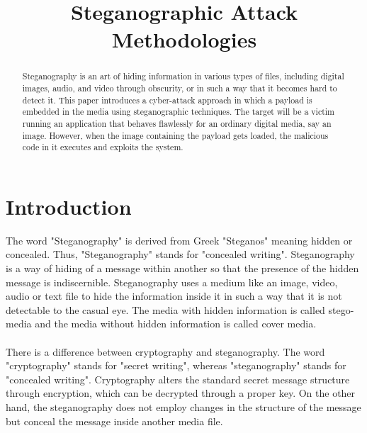 \documentclass[12ptpt,conference]{IEEEtran}
\begin{document}
\title{ \bfseries { Steganographic Attack Methodologies}}

\author{
\and
{}
\and
{}
}


\maketitle

\begin{abstract}
\noindent Steganography is an art of hiding information in various types of files, including digital images, audio, and video through obscurity, 
or in such a way that it becomes hard to detect it. This paper introduces a cyber-attack approach in which a payload is embedded in the media using steganographic techniques. The target will be a victim running an application that behaves flawlessly for an ordinary digital media, say an image. However, when the image containing the payload gets loaded, the malicious code in it executes and exploits the system.

\end{abstract}



\section {Introduction} \label {sec:intro}
\noindent The word "Steganography" is derived from Greek "Steganos" meaning hidden or concealed. Thus, "Steganography" stands for "concealed writing".
Steganography is a way of hiding of a message within another so that the presence of the hidden message is indiscernible. Steganography uses a medium like an image, video, audio or text file to hide the information inside it in such a way that it is not detectable to the casual eye.
The media with hidden information is called stego-media and the media without hidden information is called cover media.
\\
\\There is a difference between cryptography and steganography. The word "cryptography"  stands for "secret writing", whereas "steganography" stands for "concealed writing". Cryptography alters the standard secret message structure through encryption, which can be decrypted through a  proper key. On the other hand, the steganography does not employ changes in the structure of the message but conceal the message inside another media file.
\end{document}
